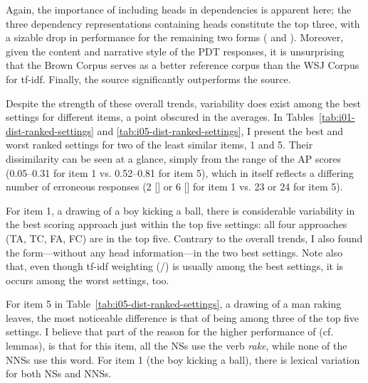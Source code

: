 Again, the importance of including heads in dependencies is apparent here; the three dependency representations containing heads constitute the top three, with a sizable drop in performance for the remaining two forms ( and ). Moreover, given the content and narrative style of the PDT responses, it is unsurprising that the Brown Corpus serves as a better reference corpus than the WSJ Corpus for tf-idf. Finally, the  source significantly outperforms the  source.

Despite the strength of these overall trends, variability
does exist among the best settings for different items, a point obscured
in the averages.  In Tables~\ref{tab:i01-dist-ranked-settings} and
\ref{tab:i05-dist-ranked-settings}, I present the best and worst
ranked settings for two of the least similar items, 1 and 5.
Their dissimilarity can be seen at a glance, simply from the range of
the AP scores (0.05--0.31 for item 1 vs. 0.52--0.81 for item 5), which
in itself reflects a differing number of erroneous responses (2 []
or 6 [] for item 1 vs. 23 or 24 for item 5).

For item 1, a drawing of a boy kicking a ball, there is considerable
variability in the best scoring approach just within the top five settings:
all four approaches (TA, TC, FA, FC) are in the top five.  Contrary to the overall
trends, I also found the  form---without any head
information---in the two best settings.  Note also that, even though
tf-idf weighting (/) is usually among the best settings, it is
occurs among the worst settings, too.

For item 5 in Table~\ref{tab:i05-dist-ranked-settings}, a drawing of a
man raking leaves, the most noticeable difference is that
of  being among three of the top five settings.
I believe that part of the reason for
the higher performance of  (cf. lemmas), is that for this
item, all the NSs use the verb \textit{rake}, while none of the NNSs use this word.  For item 1 (the boy kicking a ball), there is lexical variation
for both NSs and NNSs.


